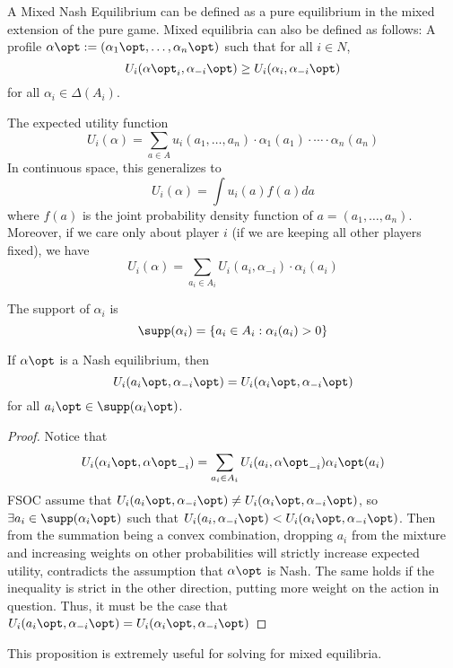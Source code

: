 \documentclass[10pt]{article}
\begin{document}
\begin{definition}
	A Mixed Nash Equilibrium can be defined as a pure equilibrium in the mixed extension of the pure game. Mixed equilibria can also be defined as follows: A profile $\alpha\opt := (\alpha_1\opt,\dots,\alpha_n\opt)$ such that for all $i \in N$,
	\[
	U_i(\alpha\opt_i,\alpha_{-i}\opt) \ge U_i(\alpha_i, \alpha_{-i}\opt)
	\]
	for all $\alpha_i \in \Delta(A_i)$.
\end{definition}
\begin{definition}
	The expected utility function \[U_i(\alpha) = \sum_{a \in A} u_i(a_1,\dots,a_n) \cdot \alpha_1(a_1) \cdot \cdots \cdot \alpha_n(a_n)\]
	In continuous space, this generalizes to
	\[
	U_i(\alpha) = \int u_i(a) f(a)da
	\]
	where $f(a)$ is the joint probability density function of $a = (a_1,\dots,a_n)$. Moreover, if we care only about player $i$ (\ie if we are keeping all other players fixed), we have
	\[
	U_i(\alpha) = \sum_{a_i \in A_i} U_i(a_i, \alpha_{-i}) \cdot \alpha_i(a_i)
	\]
\end{definition}
\begin{definition}
	The support of $\alpha_i$ is
	\[
	\supp(\alpha_i) = \{a_i \in A_i : \alpha_i(a_i) > 0\}
	\]
\end{definition}
\begin{proposition}
	If $\alpha\opt$ is a Nash equilibrium, then 
	\[
	U_i(a_i\opt,\alpha_{-i}\opt) = U_i(\alpha_i\opt,\alpha_{-i}\opt)
	\]
	for all $a_i\opt \in \supp(\alpha_i\opt)$.
\end{proposition}
\begin{proof} Notice that
	\[U_i(\alpha_i\opt,\alpha\opt_{-i}) = \sum_{a_i \in A_i} U_i(a_i,\alpha\opt_{-i}) \alpha_i\opt(a_i)\] FSOC assume that $U_i(a_i\opt,\alpha_{-i}\opt) \ne U_i(\alpha_i\opt,\alpha_{-i}\opt)$, so $\exists a_i \in \supp(\alpha_i\opt)$ such that $U_i(a_i,\alpha_{-i}\opt) < U_i(\alpha_i\opt,\alpha_{-i}\opt)$. Then from the summation being a convex combination, dropping $a_i$ from the mixture and increasing weights on other probabilities will strictly increase expected utility, contradicts the assumption that $\alpha\opt$ is Nash. The same holds if the inequality is strict in the other direction, putting more weight on the action in question. Thus, it must be the case that $U_i(a_i\opt,\alpha_{-i}\opt) = U_i(\alpha_i\opt,\alpha_{-i}\opt)$
\end{proof}

\begin{remark}
	This proposition is extremely useful for solving for mixed equilibria.
\end{remark}
\end{document}
